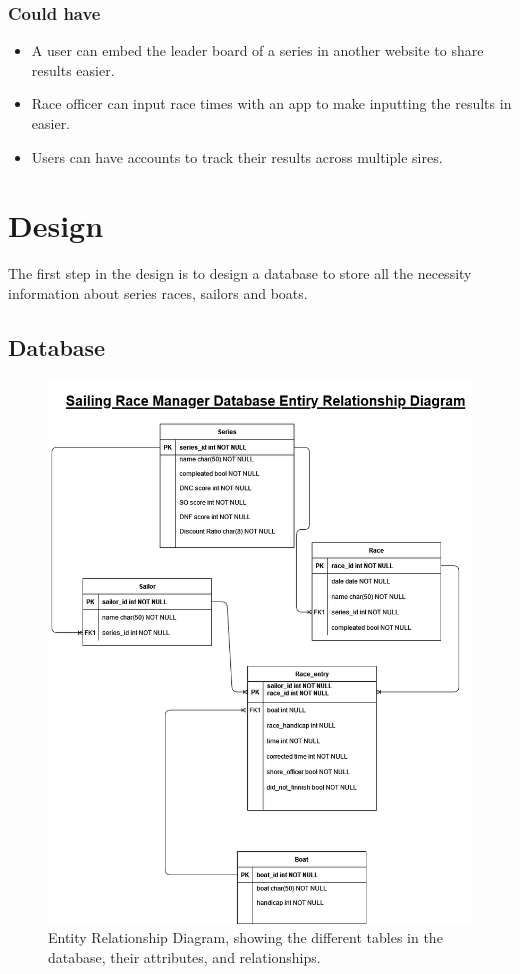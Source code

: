 \documentclass{l4proj}
\begin{document}
\subsection{Could have}
\begin{itemize}
    \item
    A user can embed the leader board of a series in another website to share results easier.
    \item
    Race officer can input race times with an app to make inputting the results in easier.
    \item
    Users can have accounts to track their results across multiple sires.
\end{itemize}

\chapter{Design}
The first step in the design is to design a database to store all the necessity information about series races, sailors and boats.
\section{Database}

\begin{figure}[h!]
    \centering
    \includegraphics[width=0.7\linewidth]{images/ERD FINAL.png} 

    \caption{Entity Relationship Diagram, showing the different tables in the database, their attributes, and relationships.
    }

    \label{fig:ERD}
\end{figure}
\end{document}
